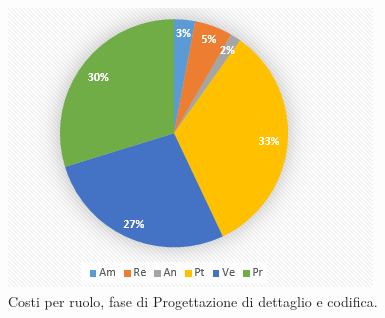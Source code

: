 \documentclass[a4paper]{report}
\begin{document}
			\begin{figure}[H]
				\centering
				\includegraphics[scale=0.7]{PCCostiCodifica}
				\caption{Costi per ruolo, fase di Progettazione di dettaglio e codifica.}
			\end{figure}
\end{document}
